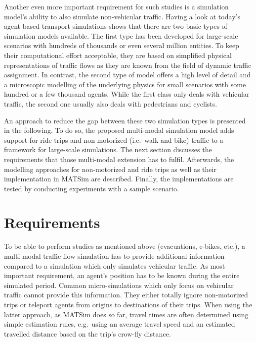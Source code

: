 Another even more important requirement for such studies is a simulation model's ability to also simulate non-vehicular traffic. Having a look at today's agent-based transport simulations shows that there are two basic types of simulation models available. The first type has been developed for large-scale scenarios with hundreds of thousands or even several million entities. To keep their computational effort acceptable, they are based on simplified physical representations of traffic flows as they are known from the field of dynamic traffic assignment. In contrast, the second type of model offers a high level of detail and a microscopic modelling of the underlying physics for small scenarios with some hundred or a few thousand agents. While the first class only deals with vehicular traffic, the second one usually also deals with pedestrians and cyclists.

An approach to reduce the gap between these two simulation types is presented in the following. To do so, the proposed multi-modal simulation model adds support for ride trips and non-motorized (i.e.~walk and bike) traffic to a framework for large-scale simulations. The next section discusses the requirements that those multi-modal extension has to fulfil. Afterwards, the modelling approaches for non-motorized and ride trips as well as their implementation in MATSim are described. Finally, the implementations are tested by conducting experiments with a sample scenario.

\section{Requirements}
To be able to perform studies as mentioned above (evacuations, e-bikes, etc.), a multi-modal traffic flow simulation has to provide additional information compared to a simulation which only simulates vehicular traffic. As most important requirement, an agent's position has to be known during the entire simulated period. Common micro-simulations which only focus on vehicular traffic cannot provide this information. They either totally ignore non-motorized trips or teleport agents from origins to destinations of their trips. When using the latter approach, as MATSim does so far, travel times are often determined using simple estimation rules, e.g.~using an average travel speed and an estimated travelled distance based on the trip's crow-fly distance.

